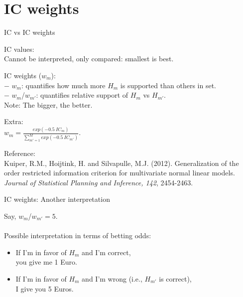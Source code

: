 \documentclass[10pt]{beamer}\usepackage[]{graphicx}\usepackage[]{xcolor}
\begin{document}
\section{IC weights}
%
%
\begin{frame}[fragile]{IC vs IC weights}
	
	IC values:\\ 
	Cannot be interpreted, only compared: smallest is best.
	
	\vspace{\baselineskip}
	
	IC weights ($\mathit{w_{m}}$): \\
	$-$ $\mathit{w_{m}}$: quantifies how much more $H_m$ is supported than others in set.\\ 
	$-$ $\mathit{w_{m}}$/$\mathit{w_{m'}}$: quantifies relative support of $H_m$ vs $H_{m'}$.\\
	Note: The bigger, the better.
	
	\vspace{\baselineskip}
	
	Extra:\\
		$\mathit{w_{m}} = \frac{exp(-0.5~IC_m)}{\sum_{m'=1}^{M}exp(-0.5~IC_{m'})}$.
	
	\vspace{\baselineskip}
	
	\footnotesize{
		Reference:\\
		Kuiper, R.M., Hoijtink, H. and Silvapulle, M.J. (2012). Generalization of the order restricted information criterion for multivariate normal linear models. \emph{Journal of Statistical Planning and Inference, 142}, 2454-2463.
	}
\end{frame}
%
\begin{frame}[fragile]{IC weights: Another interpretation}
	
	Say, $\mathit{w_{m}}$/$\mathit{w_{m'}} = 5$.\\
	~\\
	Possible interpretation in terms of betting odds:
	\begin{itemize}
	  \item If I'm in favor of $H_m$ and I'm correct, \\ you give me 1 Euro. 
	  \item If I'm in favor of $H_m$ and I'm wrong (i.e., $H_{m'}$ is correct), \\ I give you 5 Euros.
	\end{itemize}
\end{frame}
\end{document}
